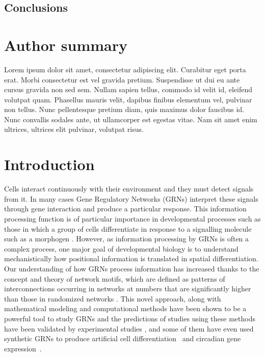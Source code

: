 \documentclass[10pt,letterpaper]{article}
\begin{document}
\subsection*{Conclusions}


\section*{Author summary}
Lorem ipsum dolor sit amet, consectetur adipiscing elit. Curabitur eget porta 
erat. Morbi consectetur est vel gravida pretium. Suspendisse ut dui eu ante 
cursus gravida non sed sem. Nullam sapien tellus, commodo id velit id, eleifend 
volutpat quam. Phasellus mauris velit, dapibus finibus elementum vel, pulvinar 
non tellus. Nunc pellentesque pretium diam, quis maximus dolor faucibus id. Nunc
convallis sodales ante, ut ullamcorper est egestas vitae. Nam sit amet enim 
ultrices, ultrices elit pulvinar, volutpat risus.

\linenumbers

\section*{Introduction}

Cells interact continuously with their environment and they must detect signals
from it. In many cases Gene Regulatory Networks (GRNs) interpret these signals
through gene interaction and produce a particular response. This information
processing function is of particular importance in developmental processes such
as those in which a group of cells differentiate in response to a signalling
molecule such as a morphogen \cite{Turing1952, Wolpert1969}. However, as
information processing by GRNs is often a complex process, one major goal of
developmental biology is to understand mechanistically how positional
information is translated in spatial differentiation.\\

Our understanding of how GRNs process information has increased thanks to the
concept and theory of network motifs, which are defined as patterns of
interconnections occurring in networks at numbers that are significantly higher
than those in randomized networks \cite{Milo2002}. This novel approach, along
with mathematical modeling and computational methods have been shown to be a
powerful tool to study GRNs and the predictions of studies using these methods
have been validated by experimental studies
\cite{Kalir2005,Kalir2004,Mangan2003a,ODonnell2005}, and some of them 
have even used synthetic GRNs to produce artificial cell differentiation~\cite{Basu2005} 
and circadian gene expression~\cite{atkinson_development_2003}.
\end{document}
